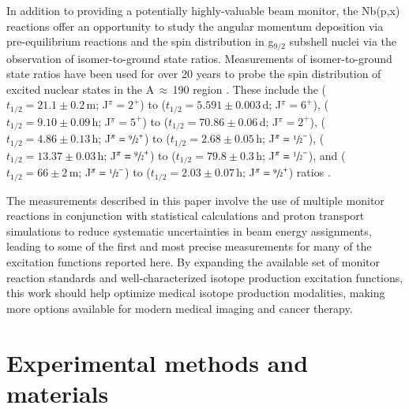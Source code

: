 %   

  
In addition to providing a potentially highly-valuable beam monitor, the Nb(p,x) reactions offer an opportunity to study the angular momentum deposition via pre-equilibrium reactions and the spin distribution in g$_{9/2}$ subshell nuclei via the observation of isomer-to-ground state ratios.  
Measurements of isomer-to-ground state ratios have been used for over 20 years to probe the spin distribution of excited nuclear states in the A\,$\approx$\,190 region \cite{PhysRevC.73.034613,PhysRevC.45.1171}.
These include the  ($t_{1/2}=21.1\pm0.2$\,m; J$^\pi=2^+$) to   ($t_{1/2}=5.591\pm0.003$\,d; J$^\pi=6^+$),  ($t_{1/2}=9.10\pm0.09$\,h; J$^\pi=5^+$) to   ($t_{1/2}=70.86\pm0.06$\,d; J$^\pi=2^+$),   ($t_{1/2}=4.86\pm0.13$\,h; J$^\pi=\sfrac{9}{2}^+$) to   ($t_{1/2}=2.68\pm0.05$\,h; J$^\pi=\sfrac{1}{2}^-$),   ($t_{1/2}=13.37\pm0.03$\,h; J$^\pi=\sfrac{9}{2}^+$) to   ($t_{1/2}=79.8\pm0.3$\,h; J$^\pi=\sfrac{1}{2}^-$),  and  ($t_{1/2}=66\pm2$\,m; J$^\pi=\sfrac{1}{2}^-$) to   ($t_{1/2}=2.03\pm0.07$\,h; J$^\pi=\sfrac{9}{2}^+$)  ratios \cite{Dong2015,Nesaraja2010,Singh2014,Johnson2015,Singh2013}.  
 
 
The measurements described in this paper involve the use of multiple monitor reactions in conjunction with statistical calculations and proton transport simulations to reduce systematic uncertainties in beam energy assignments, leading to some of the first and most precise measurements  for many of the excitation functions reported here. 
By expanding the available set of monitor reaction standards and well-characterized isotope production excitation functions, this work should help optimize medical isotope production modalities, making more options   available for modern medical imaging and cancer therapy.

 
 
 


\section{Experimental methods and materials}\label{sec:experiment}


